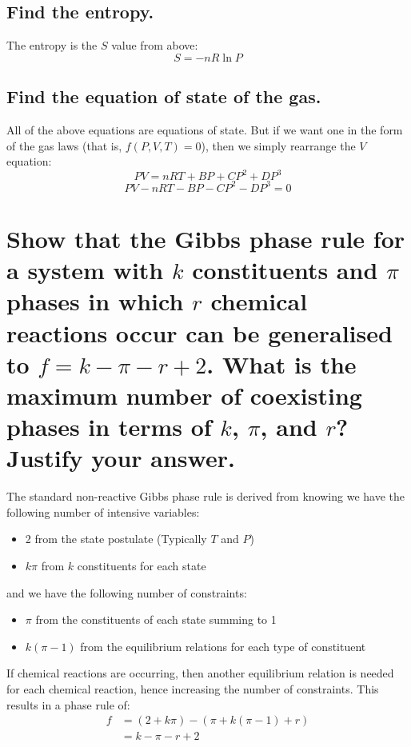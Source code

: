 \documentclass[a4paper]{scrartcl}
\begin{document}
\subsection{Find the entropy.}
The entropy is the \(S\) value from above:
\[S = -n R \ln P\]

\subsection{Find the equation of state of the gas.}
All of the above equations are equations of state. But if we want one in the form of the gas laws (that is, \(f(P, V, T) = 0\)), then we simply rearrange the \(V\) equation:
\[P V = n R T + B P + C P^2 + D P^3\]
\[P V - n R T - B P - C P^2 - D P^3 = 0\]

\section{Show that the Gibbs phase rule for a system with \(k\) constituents and \(\pi\) phases in which \(r\) chemical reactions occur can be generalised to \(f = k - \pi - r + 2\). What is the maximum number of coexisting phases in terms of \(k\), \(\pi\), and \(r\)? Justify your answer.}

The standard non-reactive Gibbs phase rule is derived from knowing we have the following number of intensive variables:
\begin{itemize}
    \item 2 from the state postulate (Typically \(T\) and \(P\))
    \item \(k \pi\) from \(k\) constituents for each state
\end{itemize}
and we have the following number of constraints:
\begin{itemize}
    \item \(\pi\) from the constituents of each state summing to 1
    \item \(k (\pi - 1)\) from the equilibrium relations for each type of constituent
\end{itemize}

If chemical reactions are occurring, then another equilibrium relation is needed for each chemical reaction, hence increasing the number of constraints. This results in a phase rule of:
\begin{align*}
    f &= (2 + k \pi) - (\pi + k (\pi - 1) + r) \\
    &= k - \pi - r + 2
\end{align*}
\end{document}
